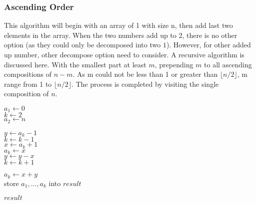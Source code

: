 \documentclass[catalog.tex]{subfiles}
\begin{document}
\subsubsection{Ascending Order}
This algorithm will begin with an array of 1 with size n, then add last two elements in the array. When the two numbers add up to 2, there is no other option (as they could only be decomposed into two $1$). However, for other added up number, other decompose option need to consider. A recursive algorithm is discussed here. With the smallest part at least $m$, prepending $m$ to all ascending compositions of $n-m$. As m could not be less than 1 or greater than $\lfloor n/2 \rfloor$, m range from 1 to  $\lfloor n/2 \rfloor$. The process is completed by visiting the single composition of $n$.
\begin{Algorithm}[AscendingDecomp\label{alg:\currfilebase_b}]
	\BlankLine
	$a_1 \leftarrow 0$ \\
	$k \leftarrow 2$ \\
	$a_2 \leftarrow n$ \\
	 {
	$y \leftarrow a_k - 1$ \\
	$k \leftarrow k - 1$ \\
	$x \leftarrow a_k + 1$ \\
	 {
		$a_k \leftarrow x$ \\
		$y \leftarrow y-x$ \\
		$k\leftarrow k+1$ \\
		}
	
		$a_k \leftarrow x + y$ \\
		store $a_1, ..., a_k$ into $result$ \\
		}
	\Ret $result$

\end{Algorithm}
\end{document}
